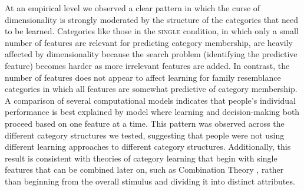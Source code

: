 \documentclass[a4paper, doc, floatsintext]{apa6}
\begin{document}
At an empirical level we observed a clear pattern in which the curse of dimensionality is strongly moderated by the structure of the categories that need to be learned. Categories like those in the \textsc{single} condition, in which only a small number of features are relevant for predicting category membership, are heavily affected by dimensionality because the search problem (identifying the predictive feature) becomes harder as more irrelevant features are added. In contrast, the number of features does not appear to affect learning for family resemblance categories in which all features are somewhat predictive of category membership. A comparison of several computational models indicates that people's individual performance is best explained by model where learning and decision-making both proceed based on one feature at a time. This pattern was observed across the different category structures we tested, suggesting that people were not using different learning approaches to different category structures. Additionally, this result is consistent with theories of category learning that begin with single features that can be combined later on, such as Combination Theory \cite{wills2015combination}, rather than beginning from the overall stimulus and dividing it into distinct attributes.


\end{document}
